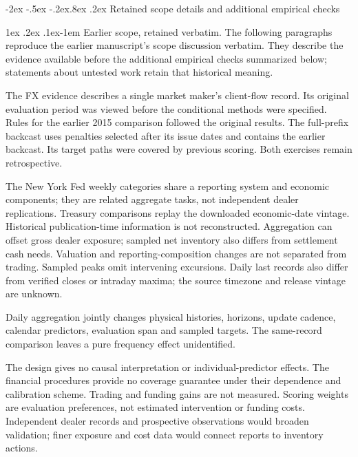 \documentclass[10pt,a4paper]{article}
\makeatletter
\renewcommand\section{\@startsection{section}{1}{\z@}%
  {-2ex \@plus -.5ex \@minus -.2ex}{.8ex \@plus .2ex}%
  {\normalfont\large\bfseries}}
\renewcommand\paragraph{\@startsection{paragraph}{4}{\z@}%
  {1ex \@plus .2ex \@minus .1ex}{-1em}%
  {\normalfont\normalsize\bfseries}}
\makeatother
\begin{document}
\section{Retained scope details and additional empirical checks}\label{sup:v12-details}

\paragraph{Earlier scope, retained verbatim.}
The following paragraphs reproduce the earlier manuscript's scope discussion verbatim. They describe the evidence available before the additional empirical checks summarized below; statements about untested work retain that historical meaning.

The FX evidence describes a single market maker's client-flow record. Its original evaluation period was viewed before the conditional methods were specified. Rules for the earlier 2015 comparison followed the original results. The full-prefix backcast uses penalties selected after its issue dates and contains the earlier backcast. Its target paths were covered by previous scoring. Both exercises remain retrospective.

The New York Fed weekly categories share a reporting system and economic components; they are related aggregate tasks, not independent dealer replications. Treasury comparisons replay the downloaded economic-date vintage. Historical publication-time information is not reconstructed. Aggregation can offset gross dealer exposure; sampled net inventory also differs from settlement cash needs. Valuation and reporting-composition changes are not separated from trading. Sampled peaks omit intervening excursions. Daily last records also differ from verified closes or intraday maxima; the source timezone and release vintage are unknown.

Daily aggregation jointly changes physical histories, horizons, update cadence, calendar predictors, evaluation span and sampled targets. The same-record comparison leaves a pure frequency effect unidentified.

The design gives no causal interpretation or individual-predictor effects. The financial procedures provide no coverage guarantee under their dependence and calibration scheme. Trading and funding gains are not measured. Scoring weights are evaluation preferences, not estimated intervention or funding costs. Independent dealer records and prospective observations would broaden validation; finer exposure and cost data would connect reports to inventory actions.
\end{document}
